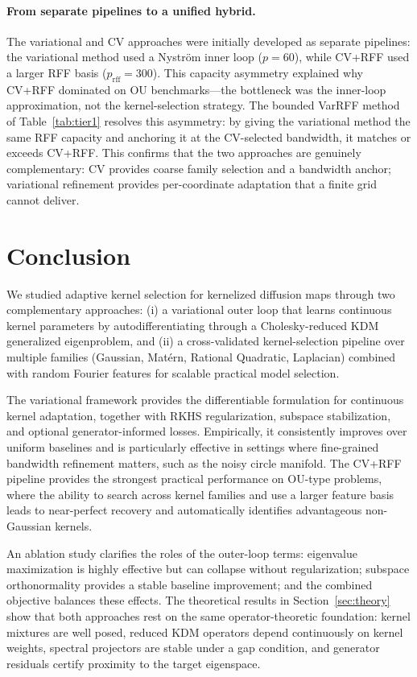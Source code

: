 \documentclass[11pt]{article}
\theoremstyle{remark}
\begin{document}
\paragraph{From separate pipelines to a unified hybrid.}
The variational and CV approaches were initially developed as separate pipelines: the variational method used a Nystr\"om inner loop ($p=60$), while CV+RFF used a larger RFF basis ($p_{\mathrm{rff}}=300$).
This capacity asymmetry explained why CV+RFF dominated on OU benchmarks---the bottleneck was the inner-loop approximation, not the kernel-selection strategy.
The bounded VarRFF method of Table~\ref{tab:tier1} resolves this asymmetry: by giving the variational method the same RFF capacity and anchoring it at the CV-selected bandwidth, it matches or exceeds CV+RFF.
This confirms that the two approaches are genuinely complementary: CV provides coarse family selection and a bandwidth anchor; variational refinement provides per-coordinate adaptation that a finite grid cannot deliver.

\section{Conclusion}
\label{sec:conclusion}

We studied adaptive kernel selection for kernelized diffusion maps through two complementary
approaches: (i) a variational outer loop that learns continuous kernel parameters by autodifferentiating
through a Cholesky-reduced KDM generalized eigenproblem, and (ii) a cross-validated kernel-selection
pipeline over multiple families (Gaussian, Mat\'ern, Rational Quadratic, Laplacian) combined with
random Fourier features for scalable practical model selection.

The variational framework provides the differentiable formulation for continuous kernel adaptation,
together with RKHS regularization, subspace stabilization, and optional generator-informed losses.
Empirically, it consistently improves over uniform baselines and is particularly effective in settings
where fine-grained bandwidth refinement matters, such as the noisy circle manifold.
The CV+RFF pipeline provides the strongest practical performance on OU-type problems, where the
ability to search across kernel families and use a larger feature basis leads to near-perfect recovery
and automatically identifies advantageous non-Gaussian kernels.

An ablation study clarifies the roles of the outer-loop terms: eigenvalue maximization is highly
effective but can collapse without regularization; subspace orthonormality provides a stable baseline
improvement; and the combined objective balances these effects. The theoretical results in Section~\ref{sec:theory}
show that both approaches rest on the same operator-theoretic foundation: kernel mixtures are
well posed, reduced KDM operators depend continuously on kernel weights, spectral projectors are
stable under a gap condition, and generator residuals certify proximity to the target eigenspace.
\end{document}
